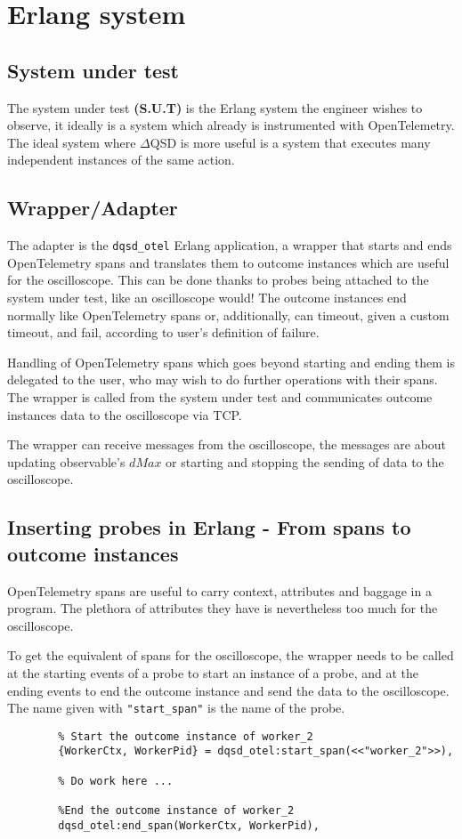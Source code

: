 \section{Erlang system} 
    
    \subsection{System under test} The system under test \textbf{(S.U.T)} is the Erlang system the engineer wishes to observe, it ideally is a system which already is instrumented with OpenTelemetry. The ideal system where $\Delta$QSD is more useful is a system that executes many independent instances of the same action. 
    
    \subsection{Wrapper/Adapter} The adapter is the \texttt{dqsd\_otel} Erlang application, a wrapper that starts and ends OpenTelemetry spans and translates them to outcome instances which are useful for the oscilloscope. This can be done thanks to probes being attached to the system under test, like an oscilloscope would! The outcome instances end normally like OpenTelemetry spans or, additionally, can timeout, given a custom timeout, and fail, according to user's definition of failure. 
    
    Handling of OpenTelemetry spans which goes beyond starting and ending them is delegated to the user, who may wish to do further operations with their spans. 
    The wrapper is called from the system under test and communicates outcome instances data to the oscilloscope via TCP. 
    
    The wrapper can receive messages from the oscilloscope, the messages are about updating observable's $dMax$ or starting and stopping the sending of data to the oscilloscope.
    \subsection{Inserting probes in Erlang - From spans to outcome instances}
        OpenTelemetry spans are useful to carry context, attributes and baggage in a program. The plethora of attributes they have is nevertheless too much for the oscilloscope.

        To get the equivalent of spans for the oscilloscope, the wrapper needs to be called at the starting events of a probe to start an instance of a probe, and at the ending events to end the outcome instance and send the data to the oscilloscope. The name given with \texttt{"start\_span"} is the name of the probe.

        \begin{verbatim}
        % Start the outcome instance of worker_2 
        {WorkerCtx, WorkerPid} = dqsd_otel:start_span(<<"worker_2">>),
        
        % Do work here ...

        %End the outcome instance of worker_2
        dqsd_otel:end_span(WorkerCtx, WorkerPid),
        \end{verbatim}
